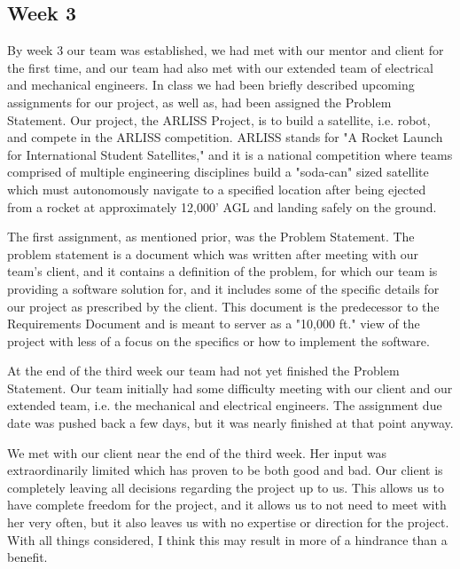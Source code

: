 \documentclass[10pt,letterpaper,onecolumn,draftclsnofoot,journal]{IEEEtran}
\begin{document}
\subsection{Week 3}
By week 3 our team was established, we had met with our mentor and client for the first time, and our team had also met with our extended team of electrical and mechanical engineers. In class we had been briefly described upcoming assignments for our project, as well as, had been assigned the Problem Statement. Our project, the ARLISS Project, is to build a satellite, i.e. robot, and compete in the ARLISS competition. ARLISS stands for "A Rocket Launch for International Student Satellites," and it is a national competition where teams comprised of multiple engineering disciplines build a "soda-can" sized satellite which must autonomously navigate to a specified location after being ejected from a rocket at approximately 12,000' AGL and landing safely on the ground.\vspace{.3cm}
\par
The first assignment, as mentioned prior, was the Problem Statement. The problem statement is a document which was written after meeting with our team's client, and it contains a definition of the problem, for which our team is providing a software solution for, and it includes some of the specific details for our project as prescribed by the client. This document is the predecessor to the Requirements Document and is meant to server as a "10,000 ft." view of the project with less of a focus on the specifics or how to implement the software.\vspace{.3cm}
\par 
At the end of the third week our team had not yet finished the Problem Statement. Our team initially had some difficulty meeting with our client and our extended team, i.e. the mechanical and electrical engineers. The assignment due date was pushed back a few days, but it was nearly finished at that point anyway.\vspace{.3cm}
\par 
We met with our client near the end of the third week. Her input was extraordinarily limited which has proven to be both good and bad. Our client is completely leaving all decisions regarding the project up to us. This allows us to have complete freedom for the project, and it allows us to not need to meet with her very often, but it also leaves us with no expertise or direction for the project. With all things considered, I think this may result in more of a hindrance than a benefit.
\end{document}
